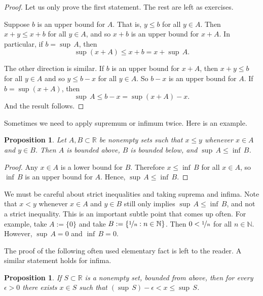 \documentclass[12pt]{book}
\newcommand{\R}{{\mathbb{R}}}
\newcommand{\N}{{\mathbb{N}}}
\theoremstyle{plain}
\newtheorem{prop}[thm]{Proposition}
\theoremstyle{remark}
\theoremstyle{definition}
\theoremstyle{exercise}
\theoremstyle{example}
\begin{document}
\begin{proof}
Let us only prove the first statement.  The rest are left as exercises.

Suppose $b$ is an upper bound for $A$.  That is, $y \leq b$ for all $y \in A$.
Then $x+y \leq x+b$ for all $y \in A$, and so $x+b$ is an upper
bound for $x+A$.  In particular, if $b = \sup\, A$, then
\begin{equation*}
\sup (x+A) \leq x+b = x+ \sup\, A .
\end{equation*}

The other direction is similar.  If $b$ is an upper bound for $x+A$,
then $x+y \leq b$
for all $y \in A$ and so $y \leq b-x$ for all $y \in A$.
So $b-x$ is an upper bound for $A$.  If $b =
\sup (x+A)$, then 
\begin{equation*}
\sup\, A \leq b-x = \sup (x+A) -x .
\end{equation*}
And the result follows.
\end{proof}

Sometimes we need to apply supremum or infimum twice.  Here is an example.

\begin{prop} \label{infsupineq:prop}
Let $A, B \subset \R$ be nonempty sets such that $x \leq y$ whenever $x \in A$ and
$y \in B$.  Then $A$ is bounded above, $B$ is bounded below, and $\sup\, A \leq \inf\, B$.
\end{prop}

\begin{proof}
Any $x \in A$ is a lower bound for $B$.  Therefore
$x \leq \inf\, B$ for all $x \in A$, so $\inf\, B$ is an upper bound for
$A$.
Hence,
$\sup\, A \leq \inf\, B$.
\end{proof}

We must be careful about strict inequalities and taking suprema and
infima.  Note that
$x < y$ whenever $x \in A$ and
$y \in B$ still only implies $\sup\, A \leq \inf\, B$, and not a strict
inequality.  This is an important subtle point that comes up often.
For example, take $A := \{ 0 \}$ and take $B := \{ \nicefrac{1}{n}
: n \in \N \}$.
Then $0 < \nicefrac{1}{n}$
for all $n \in \N$.  However, $\sup\, A = 0$ and $\inf\, B = 0$.


The proof of the following
often used elementary fact is left to the reader.
A similar statement holds for infima.

\begin{prop} \label{prop:existsxepsfromsup}
If $S \subset \R$ is a nonempty set, bounded from above,
then for every $\epsilon > 0$ there exists $x \in S$ such
that $(\sup\, S) - \epsilon < x \leq \sup\, S$.
\end{prop}
\end{document}
